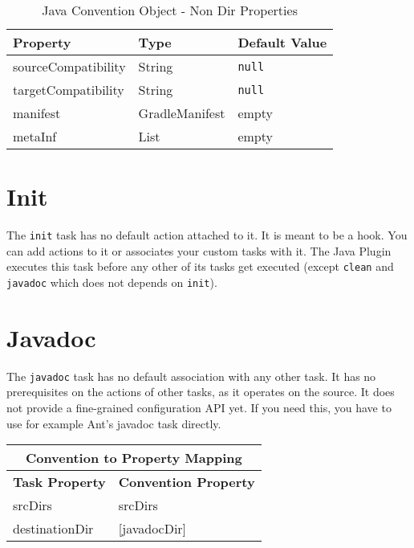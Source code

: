 \begin{table}
	\begin{center}
		\begin{tabular}{|l|l|l|} \hline
			\textbf{Property} & \textbf{Type} & \textbf{Default Value} \\ \hline
			sourceCompatibility & String & \texttt{null} \\ \hline
			targetCompatibility & String & \texttt{null} \\ \hline
			manifest & GradleManifest & empty \\ \hline
			metaInf & List & empty \\ \hline
		\end{tabular}
	\end{center}
	\caption{Java Convention Object - Non Dir Properties}
	\label{javaconventionNonDir}
\end{table}

\section{Init} %
\label{sec:initialization}
The \texttt{init} task has no default action attached to it. It is meant to be a hook. You can add actions to it or associates your custom tasks with it. The Java Plugin executes this task before any other of its tasks get executed (except \texttt{clean} and \texttt{javadoc} which does not depends on \texttt{init}).

\section{Javadoc} %
\label{sec:javadoc}
The \texttt{javadoc} task has no default association with any other task. It has no prerequisites on the actions of other tasks, as it operates on the source. It does not provide a fine-grained configuration API yet. If you need this, you have to use for example Ant's javadoc task directly.
\begin{center}
	\begin{tabular}{|l|l|} \hline
		\multicolumn{2}{|c|}{Convention to Property Mapping} \\ \hline
	    \textbf{Task Property} & \textbf{Convention Property} \\ \hline
		srcDirs & srcDirs \\ \hline
		destinationDir & [javadocDir] \\ \hline
	\end{tabular} 
\end{center} 

